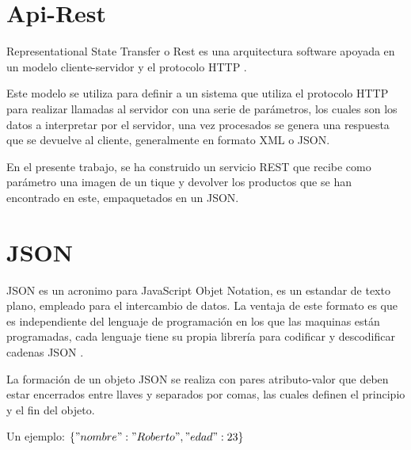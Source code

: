 \section{Api-Rest}
Representational State Transfer o Rest es una arquitectura software apoyada en un modelo cliente-servidor y el protocolo HTTP \cite{wiki:rest}.

Este modelo se utiliza para definir a un sistema que utiliza el protocolo HTTP para realizar llamadas al servidor con una serie de parámetros, los cuales son los datos  a interpretar por el servidor, una vez procesados se genera una respuesta que se devuelve al cliente, generalmente en formato XML o JSON.

En el presente trabajo, se ha construido un servicio REST que recibe como parámetro una imagen de un tique y devolver los productos que se han encontrado en este, empaquetados en un JSON.

\section{JSON}

JSON es un acronimo para JavaScript Objet Notation, es un estandar de texto plano, empleado para el intercambio de datos. La ventaja de este formato es que es independiente del lenguaje de programación en los que las maquinas están programadas, cada lenguaje tiene su propia librería para codificar y descodificar cadenas JSON \cite{json}.

La formación de un objeto JSON se realiza con pares atributo-valor que deben estar encerrados entre llaves y separados por comas, las cuales definen el principio y el fin del objeto.

Un ejemplo: \textit{$\{
"nombre":"Roberto",
"edad":23
\}$}
